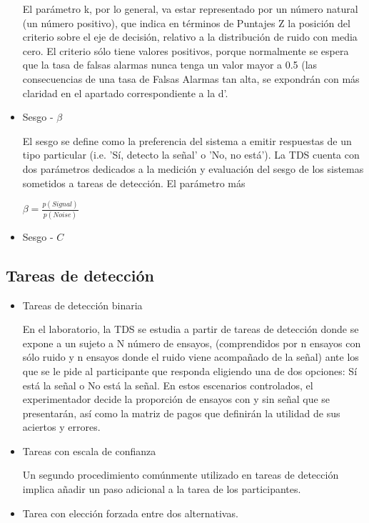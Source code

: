 \begin{itemize}
 El parámetro k, por lo general, va estar representado por un número natural (un número positivo), que indica en términos de Puntajes Z  la posición del criterio sobre el eje de decisión, relativo a la distribución de ruido con media cero. El criterio sólo tiene valores positivos, porque normalmente se espera que la tasa de falsas alarmas nunca tenga un valor mayor a 0.5 (las consecuencias de una tasa de Falsas Alarmas tan alta, se expondrán con más claridad en el apartado correspondiente a la d’. \\


\item Sesgo - $\beta$

El sesgo se define como la preferencia del sistema a emitir respuestas de un tipo particular (i.e. 'Sí, detecto la señal' o 'No, no está'). La TDS cuenta con dos parámetros dedicados a la medición y evaluación del sesgo de los sistemas sometidos a tareas de detección. El parámetro más 

$\beta = \frac{p(Signal)}{p(Noise)}$


\item Sesgo - $C$


\end{itemize}




\subsection{Tareas de detección}

\begin{itemize}
\item Tareas de detección binaria 

En el laboratorio, la  TDS se estudia a partir  de tareas de detección donde se expone a un  sujeto  a  N  número  de  ensayos,  (comprendidos  por  n  ensayos con  sólo  ruido  y  n  ensayos donde  el  ruido  viene  acompañado  de  la  señal)  ante  los  que  se  le  pide  al  participante  que responda eligiendo una de dos opciones: Sí está la señal o No está la señal. En estos escenarios controlados,  el  experimentador  decide  la  proporción  de  ensayos  con  y  sin  señal  que  se presentarán, así como la matriz de pagos que definirán la utilidad de sus aciertos y errores. \\


\item Tareas con escala de confianza

Un segundo procedimiento comúnmente utilizado en tareas de detección implica añadir un paso adicional a la tarea de los participantes. 


\item Tarea con elección forzada entre dos alternativas.
\end{itemize}

